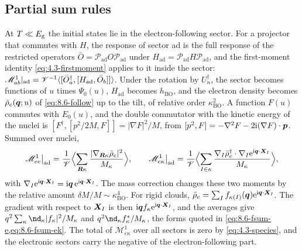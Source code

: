 \subsection{Partial sum rules}

At $T \ll E_{\mathrm{g}}$ the initial states lie in the electron-following sector. For a projector that commutes with $H$, the response of sector ad is the full response of the restricted operators $\bar O = \mathcal{P}_{\mathrm{ad}}O\mathcal{P}_{\mathrm{ad}}$ under $H_{\mathrm{ad}} = \mathcal{P}_{\mathrm{ad}}H\mathcal{P}_{\mathrm{ad}}$, and the first-moment identity \cref{eq:4.3-firstmoment} applies to it inside the sector: $\mathscr{M}^1_{ab}|_{\mathrm{ad}} = \mathscr{V}^{-1}\langle[\bar O_a^\dagger, [H_{\mathrm{ad}}, \bar O_b]]\rangle$. Under the rotation by $U_n^\dagger$, the sector becomes functions of $u$ times $\Psi_0(u)$, $H_{\mathrm{ad}}$ becomes $h_{\mathrm{BO}}$, and the electron density becomes $\bar\rho_e(\bm{q};u)$ of \cref{eq:8.6-follow} up to the tilt, of relative order $\kappa_{\mathrm{BO}}^2$. A function $F(u)$ commutes with $E_0(u)$, and the double commutator with the kinetic energy of the nuclei is $[F^\dagger, [p^2/2M, F]] = |\nabla F|^2/M$, from $[p^2, F] = -\nabla^2F - 2\mathrm{i}(\nabla F)\cdot\bm{p}$. Summed over nuclei,
\begin{equation*}
  \mathscr{M}^1_{ee}\big|_{\mathrm{ad}} = \frac1{\mathscr{V}}\Bigl\langle\sum_{\bm{R}\kappa}\frac{|\nabla_{\bm{R}\kappa}\bar\rho_e|^2}{M_\kappa}\Bigr\rangle , \qquad
  \mathscr{M}^1_{e\kappa}\big|_{\mathrm{ad}} = \frac1{\mathscr{V}}\Bigl\langle\sum_{I\in\kappa}\frac{\nabla_I\bar\rho_e^\dagger\cdot\nabla_I\mathrm{e}^{\mathrm{i}\bm{q}\cdot\bm{X}_I}}{M_\kappa}\Bigr\rangle ,
\end{equation*}
with $\nabla_I\mathrm{e}^{\mathrm{i}\bm{q}\cdot\bm{X}_I} = \mathrm{i}\bm{q}\,\mathrm{e}^{\mathrm{i}\bm{q}\cdot\bm{X}_I}$. The mass correction changes these two moments by the relative amount $\delta M/M \sim \kappa_{\mathrm{BO}}^4$. For rigid clouds, $\bar\rho_e = \sum_If_{\kappa(I)}(\bm{q})\mathrm{e}^{\mathrm{i}\bm{q}\cdot\bm{X}_I}$. The gradient with respect to $\bm{X}_I$ is then $\mathrm{i}\bm{q}f_\kappa\mathrm{e}^{\mathrm{i}\bm{q}\cdot\bm{X}_I}$, and the averages give $q^2\sum_\kappa\nd_\kappa|f_\kappa|^2/M_\kappa$ and $q^2\nd_\kappa f_\kappa^*/M_\kappa$, the forms quoted in \cref{eq:8.6-fsum-e,eq:8.6-fsum-ek}. The total of $\mathscr{M}^1_{e\kappa}$ over all sectors is zero by \cref{eq:4.3-species}, and the electronic sectors carry the negative of the electron-following part.

